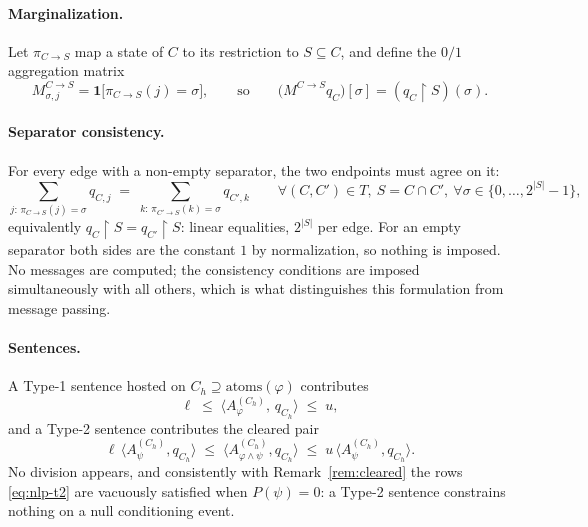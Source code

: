 \documentclass{article} %
\newcommand{\atoms}{\mathrm{atoms}}
\newcommand{\restr}{\!\restriction\!}
\begin{document}
\paragraph{Marginalization.}
Let $\pi_{C\to S}$ map a state of $C$ to its restriction to $S\subseteq C$,
and define the $0/1$ aggregation matrix
\begin{equation}\label{eq:nlp-M}
  M^{C\to S}_{\sigma,j}=\mathbf 1\bigl[\pi_{C\to S}(j)=\sigma\bigr],
  \qquad\text{so}\qquad
  \bigl(M^{C\to S}q_C\bigr)[\sigma]=(q_C\restr S)(\sigma).
\end{equation}

\paragraph{Separator consistency.}
For every edge with a non-empty separator, the two endpoints must agree on it:
\begin{equation}\label{eq:nlp-sep}
  \sum_{j:\,\pi_{C\to S}(j)=\sigma}q_{C,j}
  \;=\;\sum_{k:\,\pi_{C'\to S}(k)=\sigma}q_{C',k}
  \qquad\forall(C,C')\in T,\ S=C\cap C',\ \forall \sigma\in\{0,\dots,2^{|S|}-1\},
\end{equation}
equivalently $q_C\restr S=q_{C'}\restr S$: linear equalities,
$2^{|S|}$ per edge. For an empty separator both sides are the constant $1$ by
normalization, so nothing is imposed. No messages are computed; the consistency
conditions are imposed simultaneously with all others, which is what
distinguishes this formulation from message passing.

\paragraph{Sentences.}
A Type-1 sentence hosted on $C_h\supseteq\atoms(\varphi)$ contributes
\begin{equation}\label{eq:nlp-t1}
  \ell\;\le\;\bigl\langle A^{(C_h)}_{\varphi},\,q_{C_h}\bigr\rangle\;\le\;u,
\end{equation}
and a Type-2 sentence contributes the cleared pair
\begin{equation}\label{eq:nlp-t2}
  \ell\,\bigl\langle A^{(C_h)}_{\psi},q_{C_h}\bigr\rangle
  \;\le\;\bigl\langle A^{(C_h)}_{\varphi\wedge\psi},q_{C_h}\bigr\rangle
  \;\le\;u\,\bigl\langle A^{(C_h)}_{\psi},q_{C_h}\bigr\rangle .
\end{equation}
No division appears, and consistently with Remark~\ref{rem:cleared} the rows
\eqref{eq:nlp-t2} are vacuously satisfied when $P(\psi)=0$: a Type-2 sentence
constrains nothing on a null conditioning event.
\end{document}
